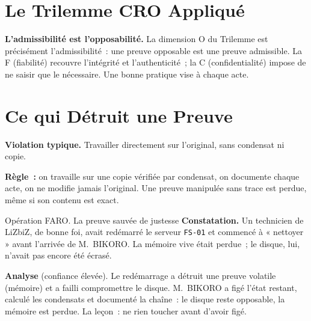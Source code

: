 \section{Le Trilemme CRO Appliqué}
\label{sec:c10-cro}

\begin{boxCRO}
\textbf{L'admissibilité est l'opposabilité.} La dimension O du Trilemme est
précisément l'admissibilité~: une preuve opposable est une preuve admissible.
La F (fiabilité) recouvre l'intégrité et l'authenticité~; la C
(confidentialité) impose de ne saisir que le nécessaire. Une bonne pratique
vise  à chaque acte.
\end{boxCRO}

\section{Ce qui Détruit une Preuve}
\label{sec:c10-detruire}

\begin{boxalert}
\textbf{Violation typique.} Travailler directement sur l'original, sans
condensat ni copie.

\smallskip
\textbf{Règle~:} on travaille sur une copie vérifiée par condensat, on
documente chaque acte, on ne modifie jamais l'original. Une preuve manipulée
sans trace est perdue, même si son contenu est exact.
\end{boxalert}

\begin{boxscenario}{Opération FARO. La preuve sauvée de justesse}
\textbf{Constatation.} Un technicien de LiZbiZ, de bonne foi, avait
redémarré le serveur \texttt{FS-01} et commencé à « nettoyer » avant
l'arrivée de M.~BIKORO. La mémoire vive était perdue~; le disque, lui, n'avait
pas encore été écrasé.

\medskip
\textbf{Analyse} (confiance élevée). Le redémarrage a détruit une preuve
volatile (mémoire) et a failli compromettre le disque. M.~BIKORO a figé
l'état restant, calculé les condensats et documenté la chaîne~: le disque
reste opposable, la mémoire est perdue. La leçon~: ne rien toucher avant
d'avoir figé.
\end{boxscenario}


